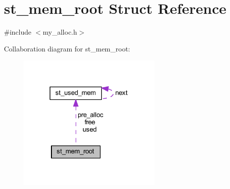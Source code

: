 \hypertarget{structst__mem__root}{}\section{st\+\_\+mem\+\_\+root Struct Reference}
\label{structst__mem__root}


{\ttfamily \#include $<$my\+\_\+alloc.\+h$>$}



Collaboration diagram for st\+\_\+mem\+\_\+root\+:\nopagebreak
\begin{figure}[H]
\begin{center}
\leavevmode
\includegraphics[width=198pt]{structst__mem__root__coll__graph}
\end{center}
\end{figure}
